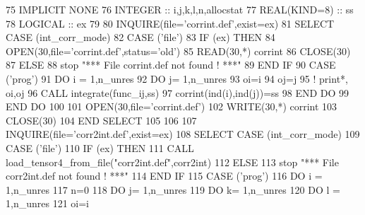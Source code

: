 \begin{DoxyCode}
75     \textcolor{keywordtype}{IMPLICIT NONE}
76     \textcolor{keywordtype}{INTEGER} :: i,j,k,l,n,allocstat
77     \textcolor{keywordtype}{REAL(KIND=8)} :: ss
78     \textcolor{keywordtype}{LOGICAL} :: ex
79 
80     \textcolor{keyword}{INQUIRE}(file=\textcolor{stringliteral}{'corrint.def'},exist=ex)
81     \textcolor{keywordflow}{SELECT CASE} (int\_corr\_mode)
82     \textcolor{keywordflow}{CASE} (\textcolor{stringliteral}{'file'})
83        \textcolor{keywordflow}{IF} (ex) \textcolor{keywordflow}{THEN}
84           \textcolor{keyword}{OPEN}(30,file=\textcolor{stringliteral}{'corrint.def'},status=\textcolor{stringliteral}{'old'})
85           \textcolor{keyword}{READ}(30,*) corrint
86           \textcolor{keyword}{CLOSE}(30)
87        \textcolor{keywordflow}{ELSE}
88           stop \textcolor{stringliteral}{"*** File corrint.def not found ! ***"}
89 \textcolor{keywordflow}{       END IF}
90     \textcolor{keywordflow}{CASE} (\textcolor{stringliteral}{'prog'})
91        \textcolor{keywordflow}{DO} i = 1,n\_unres
92           \textcolor{keywordflow}{DO} j= 1,n\_unres
93              oi=i
94              oj=j
95              \textcolor{comment}{!   print*, oi,oj}
96              \textcolor{keyword}{CALL }integrate(func\_ij,ss)
97              corrint(ind(i),ind(j))=ss
98 \textcolor{keywordflow}{          END DO}
99 \textcolor{keywordflow}{       END DO}
100 
101        \textcolor{keyword}{OPEN}(30,file=\textcolor{stringliteral}{'corrint.def'})
102        \textcolor{keyword}{WRITE}(30,*) corrint
103        \textcolor{keyword}{CLOSE}(30)
104 \textcolor{keywordflow}{    END SELECT}
105 
106 
107     \textcolor{keyword}{INQUIRE}(file=\textcolor{stringliteral}{'corr2int.def'},exist=ex)
108     \textcolor{keywordflow}{SELECT CASE} (int\_corr\_mode)
109     \textcolor{keywordflow}{CASE} (\textcolor{stringliteral}{'file'})
110        \textcolor{keywordflow}{IF} (ex) \textcolor{keywordflow}{THEN}
111           \textcolor{keyword}{CALL }load\_tensor4\_from\_file(\textcolor{stringliteral}{"corr2int.def"},corr2int)
112        \textcolor{keywordflow}{ELSE}
113           stop \textcolor{stringliteral}{"*** File corr2int.def not found ! ***"}
114 \textcolor{keywordflow}{       END IF}
115     \textcolor{keywordflow}{CASE} (\textcolor{stringliteral}{'prog'})
116        \textcolor{keywordflow}{DO} i = 1,n\_unres
117           n=0
118           \textcolor{keywordflow}{DO} j= 1,n\_unres
119              \textcolor{keywordflow}{DO} k= 1,n\_unres
120                 \textcolor{keywordflow}{DO} l = 1,n\_unres
121                    oi=i

\end{DoxyCode}
